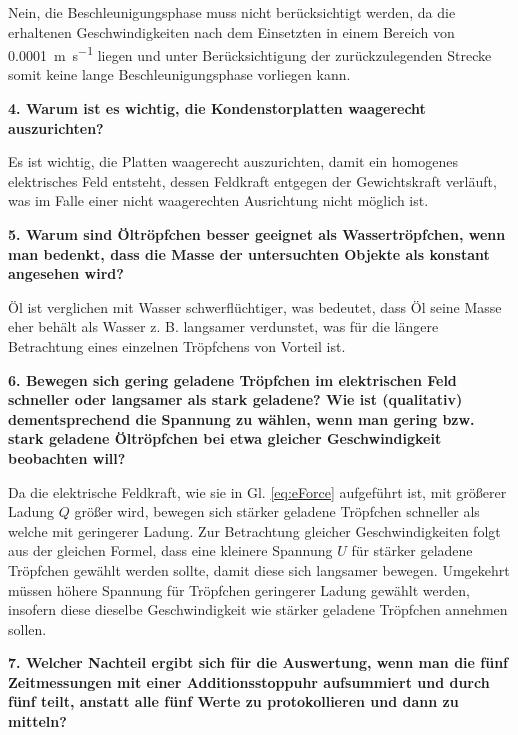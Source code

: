 	Nein, die Beschleunigungsphase muss nicht berücksichtigt werden, da die erhaltenen Geschwindigkeiten nach dem Einsetzten in einem Bereich von \SI{0,0001}{\meter\per\second} liegen und unter Berücksichtigung der zurückzulegenden Strecke somit keine lange Beschleunigungsphase vorliegen kann.
	
\vspace{0,5cm}
\noindent \textbf{4. Warum ist es wichtig, die Kondenstorplatten waagerecht auszurichten?}

	Es ist wichtig, die Platten waagerecht auszurichten, damit ein homogenes elektrisches Feld entsteht, dessen Feldkraft entgegen der Gewichtskraft verläuft, was im Falle einer nicht waagerechten Ausrichtung nicht möglich ist.

\vspace{0,5cm}
\noindent \textbf{5. Warum sind Öltröpfchen besser geeignet als Wassertröpfchen, wenn man bedenkt, dass die Masse der untersuchten Objekte als konstant angesehen wird?}

	Öl ist verglichen mit Wasser schwerflüchtiger, was bedeutet, dass Öl seine Masse eher behält als Wasser z. B. langsamer verdunstet, was für die längere Betrachtung eines einzelnen Tröpfchens von Vorteil ist.

\vspace{0,5cm}
\noindent \textbf{6. Bewegen sich gering geladene Tröpfchen im elektrischen Feld schneller oder langsamer als stark geladene? Wie ist (qualitativ) dementsprechend die Spannung zu wählen, wenn man gering bzw. stark geladene Öltröpfchen bei etwa gleicher Geschwindigkeit beobachten will?}

	Da die elektrische Feldkraft, wie sie in Gl. \ref{eq:eForce} aufgeführt ist, mit größerer Ladung $Q$ größer wird, bewegen sich stärker geladene Tröpfchen schneller als welche mit geringerer Ladung. Zur Betrachtung gleicher Geschwindigkeiten folgt aus der gleichen Formel, dass eine kleinere Spannung $U$ für stärker geladene Tröpfchen gewählt werden sollte, damit diese sich langsamer bewegen. Umgekehrt müssen höhere Spannung für Tröpfchen geringerer Ladung gewählt werden, insofern diese dieselbe Geschwindigkeit wie stärker geladene Tröpfchen annehmen sollen.

\vspace{0,5cm}
\noindent \textbf{7. Welcher Nachteil ergibt sich für die Auswertung, wenn man die fünf Zeitmessungen mit einer Additionsstoppuhr aufsummiert und durch fünf teilt, anstatt alle fünf Werte zu protokollieren und dann zu mitteln?}

